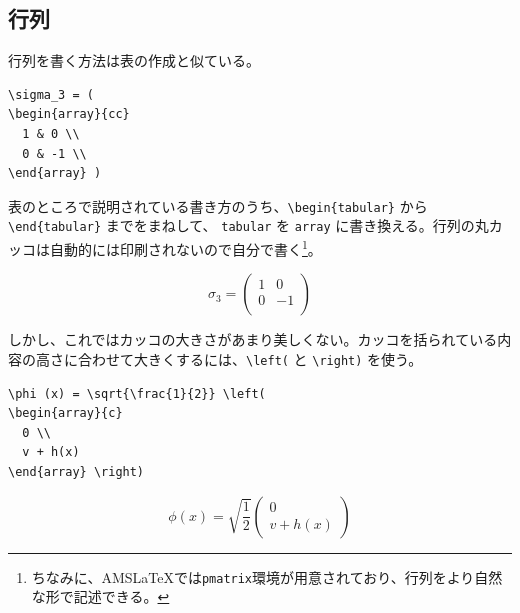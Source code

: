 \subsection{行列}
\label{sec:latex:matrix}

行列を書く方法は表の作成と似ている。
\begin{reidai}
\begin{verbatim}
\sigma_3 = (
\begin{array}{cc}
  1 & 0 \\
  0 & -1 \\
\end{array} )
\end{verbatim}
\end{reidai} \noindent
表のところで説明されている書き方のうち、\verb|\begin{tabular}| から\verb|\end{tabular}| までをまねして、 \texttt{tabular} を \texttt{array} に書き換える。行列の丸カッコは自動的には印刷されないので自分で書く\footnote{ちなみに、AMS\LaTeX では{\tt pmatrix}環境が用意されており、行列をより自然な形で記述できる。}。
\begin{kekka}
  \begin{equation*}
    \sigma_3 = (
    \begin{array}{cc}
      1 & 0 \\
      0 & -1 \\
    \end{array} )
  \end{equation*}
  \vspace{0pt}
\end{kekka} \noindent
しかし、これではカッコの大きさがあまり美しくない。カッコを括られている内容の高さに合わせて大きくするには、\verb|\left(| と \verb|\right)| を使う。
\begin{reidai}
\begin{verbatim}
\phi (x) = \sqrt{\frac{1}{2}} \left(
\begin{array}{c}
  0 \\
  v + h(x)
\end{array} \right)
\end{verbatim}
\end{reidai} \noindent
\vspace*{-1.5em}
\begin{kekka}
  \begin{equation}
    \phi (x) = \sqrt{\frac{1}{2}} \left(
      \begin{array}{c}
        0 \\
        v + h(x)
      \end{array} \right)
  \end{equation}
  \vspace{0pt}
\end{kekka} \noindent
